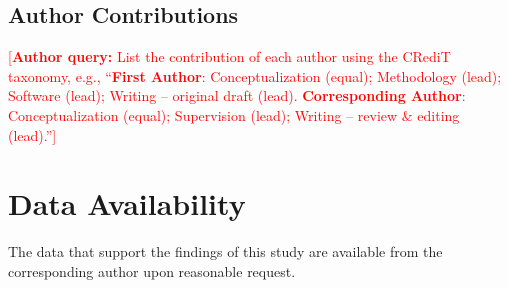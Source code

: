 \documentclass[%
  aip,cha,
  amsmath,amssymb,
  reprint,
  article-title,
]{revtex4-2}
\newcommand{\AQ}[1]{\textcolor{red}{[\textbf{Author query:} #1]}}
\begin{document}
\subsection*{Author Contributions}
\AQ{List the contribution of each author using the CRediT taxonomy, e.g., ``\textbf{First Author}: Conceptualization (equal); Methodology (lead); Software (lead); Writing -- original draft (lead). \textbf{Corresponding Author}: Conceptualization (equal); Supervision (lead); Writing -- review \& editing (lead).''}

\section*{Data Availability}
The data that support the findings of this study are available from the corresponding author upon reasonable request.

\renewcommand{\bibsection}{\section*{References}}

\end{document}
